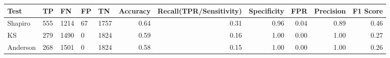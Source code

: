 \begin{tabular}{lllllrrrrrr}
\toprule
Test & TP & FN & FP & TN & Accuracy & Recall(TPR/Sensitivity) & Specificity & FPR & Precision & F1 Score \\
\midrule
Shapiro & 555 & 1214 & 67 & 1757 & 0.64 & 0.31 & 0.96 & 0.04 & 0.89 & 0.46 \\
KS & 279 & 1490 & 0 & 1824 & 0.59 & 0.16 & 1.00 & 0.00 & 1.00 & 0.27 \\
Anderson & 268 & 1501 & 0 & 1824 & 0.58 & 0.15 & 1.00 & 0.00 & 1.00 & 0.26 \\
\bottomrule
\end{tabular}
